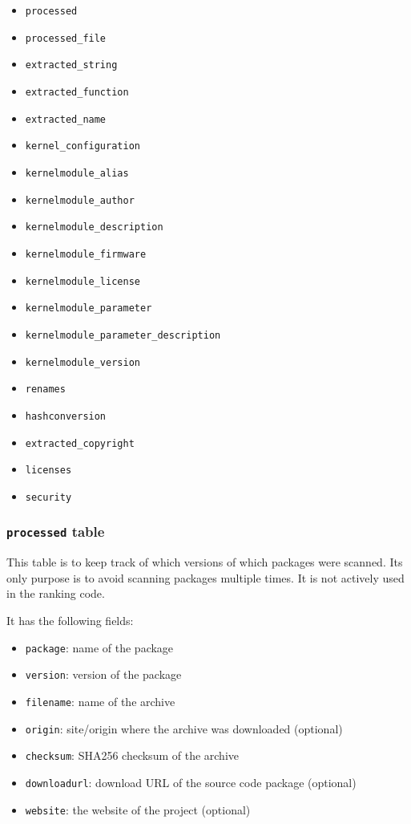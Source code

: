 \documentclass[10pt,a4paper]{article}
\begin{document}
\begin{itemize}
\item \texttt{processed}
\item \texttt{processed\_file}
\item \texttt{extracted\_string}
\item \texttt{extracted\_function}
\item \texttt{extracted\_name}
\item \texttt{kernel\_configuration}
\item \texttt{kernelmodule\_alias}
\item \texttt{kernelmodule\_author}
\item \texttt{kernelmodule\_description}
\item \texttt{kernelmodule\_firmware}
\item \texttt{kernelmodule\_license}
\item \texttt{kernelmodule\_parameter}
\item \texttt{kernelmodule\_parameter\_description}
\item \texttt{kernelmodule\_version}
\item \texttt{renames}
\item \texttt{hashconversion}
\item \texttt{extracted\_copyright}
\item \texttt{licenses}
\item \texttt{security}
\end{itemize}

\subsubsection{\texttt{processed} table}

This table is to keep track of which versions of which packages were scanned.
Its only purpose is to avoid scanning packages multiple times. It is not
actively used in the ranking code.

It has the following fields:

\begin{itemize}
\item \texttt{package}: name of the package
\item \texttt{version}: version of the package
\item \texttt{filename}: name of the archive
\item \texttt{origin}: site/origin where the archive was downloaded (optional)
\item \texttt{checksum}: SHA256 checksum of the archive
\item \texttt{downloadurl}: download URL of the source code package (optional)
\item \texttt{website}: the website of the project (optional)
\end{itemize}
\end{document}
